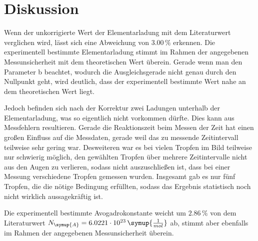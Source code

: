 \section{Diskussion}
\label{sec:Diskussion}

Wenn der unkorrigierte Wert der Elementarladung mit dem Literaturwert verglichen wird, lässt sich eine Abweichung von $3.00 \,\%$ erkennen. Die
experimentell bestimmte Elementarladung stimmt im Rahmen der angegebenen Messunsicherheit mit dem theoretischen Wert überein. Gerade wenn man den 
Parameter b beachtet, wodurch die Ausgleichsgerade nicht genau durch den Nullpunkt geht, wird deutlich, dass der experimentell bestimmte Wert nahe an 
dem theoretischen Wert liegt. 

Jedoch befinden sich nach der
Korrektur zwei Ladungen unterhalb der Elementarladung, was so eigentlich nicht vorkommen dürfte. Dies kann aus Messfehlern resultieren. Gerade die Reaktionszeit beim Messen der Zeit hat einen großen Einfluss auf die Messdaten, gerade weil
das zu messende Zeitintervall teilweise sehr gering war. Desweiteren war es bei vielen Tropfen im Bild teilweise nur schwierig möglich, den gewählten 
Tropfen über mehrere Zeitintervalle nicht aus den Augen zu verlieren, sodass nicht auszuschließen ist, dass bei einer Messung verschiedene Tropfen 
gemessen wurden. Insgesamt gab es nur fünf Tropfen, die die nötige Bedingung erfüllten, sodass das Ergebnis statistisch noch nicht wirklich aussagekräftig ist.

Die experimentell bestimmte Avogadrokonstante weicht um $2.86\,\%$ von dem Literaturwert $N_{\symup{A}}=6.0221 \cdot10^{23} \,\symup{\frac{1}{mol}}$ 
\cite{avo} ab, stimmt aber ebenfalls im Rahmen der angegebenen Messunsicherheit überein.